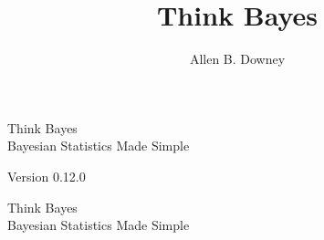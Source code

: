 \documentclass[12pt]{book}
\title{Think Bayes}
\author{Allen B. Downey}
\newcommand{\theversion}{0.12.0}
\newif\ifplastex
\begin{document}
\frontmatter

\ifplastex

\else
\fi

\newcommand{\PMF}{\mathrm{PMF}}
\newcommand{\PDF}{\mathrm{PDF}}
\newcommand{\CDF}{\mathrm{CDF}}
\newcommand{\ICDF}{\mathrm{ICDF}}

\ifplastex
    \usepackage{localdef}
    \maketitle

\else



\begin{latexonly}

\renewcommand{\blankpage}{\thispagestyle{empty} \quad \newpage}


\thispagestyle{empty}

\begin{flushright}
\vspace*{2.0in}

\begin{spacing}{3}
{\huge Think Bayes}\\
{\Large Bayesian Statistics Made Simple}
\end{spacing}

\vspace{0.25in}

Version \theversion

\vfill

\end{flushright}


\blankpage
\blankpage

\pagebreak
\thispagestyle{empty}

\begin{flushright}
\vspace*{2.0in}

\begin{spacing}{3}
{\huge Think Bayes}\\
{\Large Bayesian Statistics Made Simple}
\end{spacing}

\vspace{0.25in}


\end{flushright}
\end{latexonly}
\end{document}
